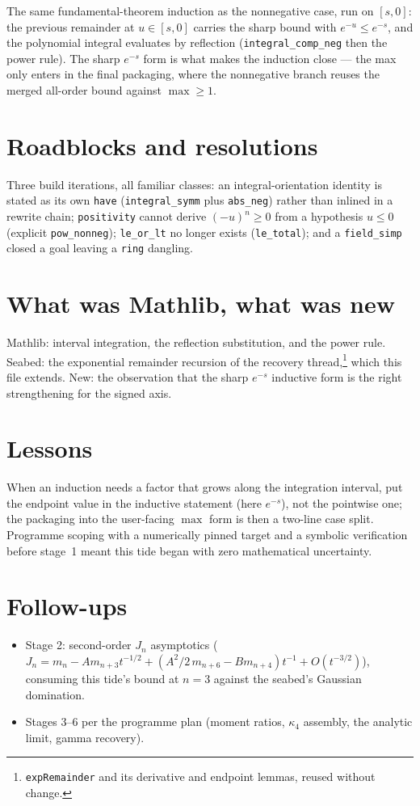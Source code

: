 \documentclass[11pt]{article}
\begin{document}
The same fundamental-theorem induction as the nonnegative case, run on
$[s, 0]$: the previous remainder at $u \in [s, 0]$ carries the sharp
bound with $e^{-u} \leq e^{-s}$, and the polynomial integral evaluates
by reflection (\texttt{integral\_comp\_neg} then the power rule). The
sharp $e^{-s}$ form is what makes the induction close --- the max only
enters in the final packaging, where the nonnegative branch reuses the
merged all-order bound against $\max \geq 1$.

\section{Roadblocks and resolutions}

Three build iterations, all familiar classes: an integral-orientation
identity is stated as its own \texttt{have}
(\texttt{integral\_symm} plus \texttt{abs\_neg}) rather than inlined in
a rewrite chain; \texttt{positivity} cannot derive
$(-u)^n \geq 0$ from a hypothesis $u \leq 0$ (explicit
\texttt{pow\_nonneg}); \texttt{le\_or\_lt} no longer exists
(\texttt{le\_total}); and a \texttt{field\_simp} closed a goal leaving
a \texttt{ring} dangling.

\section{What was Mathlib, what was new}

Mathlib: interval integration, the reflection substitution, and the
power rule. Seabed: the exponential remainder recursion of the recovery
thread,\footnote{\texttt{expRemainder} and its derivative and endpoint
lemmas, reused without change.} which this file extends. New: the observation that the sharp $e^{-s}$ inductive form is
the right strengthening for the signed axis.

\section{Lessons}

When an induction needs a factor that grows along the integration
interval, put the endpoint value in the inductive statement (here
$e^{-s}$), not the pointwise one; the packaging into the user-facing
$\max$ form is then a two-line case split. Programme scoping with a
numerically pinned target and a symbolic verification before stage~1
meant this tide began with zero mathematical uncertainty.

\section{Follow-ups}

\begin{itemize}
\item Stage 2: second-order $J_n$ asymptotics
($J_n = m_n - A m_{n+3} t^{-1/2} + (A^2/2\, m_{n+6} - B m_{n+4})
t^{-1} + O(t^{-3/2})$), consuming this tide's bound at $n = 3$ against
the seabed's Gaussian domination.
\item Stages 3--6 per the programme plan (moment ratios, $\kappa_4$
assembly, the analytic limit, gamma recovery).
\end{itemize}
\end{document}
